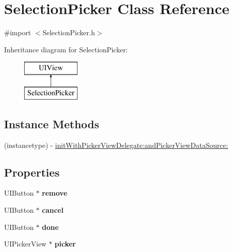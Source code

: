 \hypertarget{interface_selection_picker}{\section{Selection\+Picker Class Reference}
\label{interface_selection_picker}
}


{\ttfamily \#import $<$Selection\+Picker.\+h$>$}

Inheritance diagram for Selection\+Picker\+:\begin{figure}[H]
\begin{center}
\leavevmode
\includegraphics[height=2.000000cm]{interface_selection_picker}
\end{center}
\end{figure}
\subsection*{Instance Methods}
\begin{DoxyCompactItemize}
\item 
(instancetype) -\/ \hyperlink{interface_selection_picker_ad5fcb03fe065cf8fcaf765825562cfc1}{init\+With\+Picker\+View\+Delegate\+:and\+Picker\+View\+Data\+Source\+:}
\end{DoxyCompactItemize}
\subsection*{Properties}
\begin{DoxyCompactItemize}
\item 
\hypertarget{interface_selection_picker_a060c08f65fc47029ed1902e796a03925}{U\+I\+Button $\ast$ {\bfseries remove}}\label{interface_selection_picker_a060c08f65fc47029ed1902e796a03925}

\item 
\hypertarget{interface_selection_picker_ad419e9278ed75268dda0e48c5ce43822}{U\+I\+Button $\ast$ {\bfseries cancel}}\label{interface_selection_picker_ad419e9278ed75268dda0e48c5ce43822}

\item 
\hypertarget{interface_selection_picker_aa43b12e68fd0c7c20745380fc60b6b88}{U\+I\+Button $\ast$ {\bfseries done}}\label{interface_selection_picker_aa43b12e68fd0c7c20745380fc60b6b88}

\item 
\hypertarget{interface_selection_picker_aa2a3f2d050d8e454ee7158ab17735c5f}{U\+I\+Picker\+View $\ast$ {\bfseries picker}}\label{interface_selection_picker_aa2a3f2d050d8e454ee7158ab17735c5f}

\end{DoxyCompactItemize}


